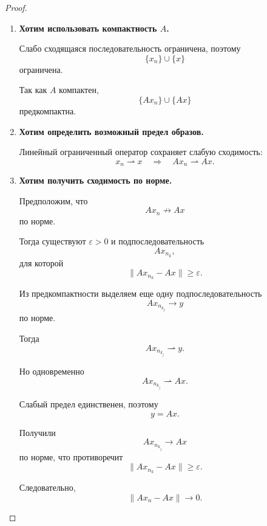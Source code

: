 \begin{proof}
	\begin{enumerate}
		\item
		\textbf{Хотим использовать компактность \(A\).}
		
		Слабо сходящаяся последовательность ограничена, поэтому
		\[
		\{x_n\}\cup\{x\}
		\]
		ограничена.
		
		Так как \(A\) компактен,
		\[
		\{Ax_n\}\cup\{Ax\}
		\]
		предкомпактна.
		
		\item
		\textbf{Хотим определить возможный предел образов.}
		
		Линейный ограниченный оператор сохраняет слабую сходимость:
		\[
		x_n\rightharpoonup x
		\quad\Longrightarrow\quad
		Ax_n\rightharpoonup Ax.
		\]
		
		\item
		\textbf{Хотим получить сходимость по норме.}
		
		Предположим, что
		\[
		Ax_n\not\to Ax
		\]
		по норме.
		
		Тогда существуют \(\varepsilon>0\) и подпоследовательность
		\[
		Ax_{n_k},
		\]
		для которой
		\[
		\|Ax_{n_k}-Ax\|\geq\varepsilon.
		\]
		
		Из предкомпактности выделяем еще одну подпоследовательность
		\[
		Ax_{n_{k_j}}\to y
		\]
		по норме.
		
		Тогда
		\[
		Ax_{n_{k_j}}\rightharpoonup y.
		\]
		
		Но одновременно
		\[
		Ax_{n_{k_j}}\rightharpoonup Ax.
		\]
		
		Слабый предел единственен, поэтому
		\[
		y=Ax.
		\]
		
		Получили
		\[
		Ax_{n_{k_j}}\to Ax
		\]
		по норме, что противоречит
		\[
		\|Ax_{n_k}-Ax\|\geq\varepsilon.
		\]
		
		Следовательно,
		\[
		\boxed{\|Ax_n-Ax\|\to0.}
		\]
	\end{enumerate}
\end{proof}